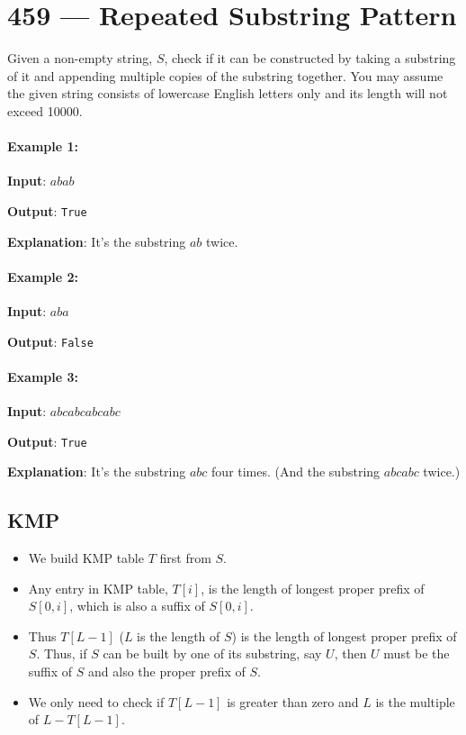 \section{459 --- Repeated Substring Pattern}
Given a non-empty string, $S$, check if it can be constructed by taking a substring of it and appending multiple copies of the substring together. You may assume the given string consists of lowercase English letters only and its length will not exceed 10000.

\paragraph{Example 1:}

\begin{flushleft}
\textbf{Input}: $ abab $

\textbf{Output}: \texttt{True}

\textbf{Explanation}: It's the substring $ ab $ twice.

\end{flushleft}

\paragraph{Example 2:}

\begin{flushleft}
\textbf{Input}: $ aba $

\textbf{Output}: \texttt{False}
\end{flushleft}


\paragraph{Example 3:}

\begin{flushleft}
\textbf{Input}: $ abcabcabcabc $

\textbf{Output}: \texttt{True}

\textbf{Explanation}: It's the substring $ abc $ four times. (And the substring $ abcabc $ twice.)

\end{flushleft}

\subsection{KMP}
\begin{itemize}
\item We build KMP table $T$ first from $S$.
\item Any entry in KMP table, $T[i]$, is the length of longest proper prefix of $S[0,i]$, which is also a suffix of $S[0,i]$.
\item Thus $T[L-1]$ ($L$ is the length of $S$) is the length of longest proper prefix of $S$. Thus, if $S$ can be built by one of its substring, say $U$, then $U$ must be the suffix of $S$ and also the proper prefix of $S$.
\item We only need to check if $T[L-1]$ is greater than zero and $L$ is the multiple of $L-T[L-1]$.  
\end{itemize}

